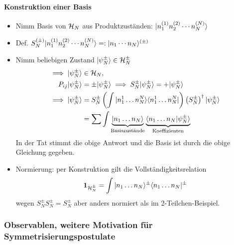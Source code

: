 \documentclass[11pt,a4paper]{report}
\begin{document}
\paragraph{Konstruktion einer Basis}
\begin{itemize}
\item Nimm Basis von $\mathcal{H}_N$ aus Produktzuständen: $|n_1^{(1)}n_2^{(2)}\cdots n_N^{(N)}\rangle$
\item Def. $S_N^{(\pm )}|n_1^{(1)}n_2^{(2)}\cdots n_N^{(N)}\rangle =: |n_1\cdots n_N\rangle^{(\pm )}$
\item Nimm beliebigen Zustand $|\psi_N^{\pm}\rangle \in \mathcal{H}_N^{\pm}$
\begin{align*}
    \implies |\psi_N^{\pm}\rangle &\in \mathcal{H}_N, \\
    P_{i j} |\psi_N^{\pm}\rangle &= \pm |\psi_N^{\pm}\rangle \implies S_N^{\pm} |\psi_N^{\pm}\rangle = + |\psi_N^{\pm}\rangle \\
    \implies |\psi_N^{\pm}\rangle &=  S_N^{\pm} \left(\int |n_1^1 \ldots n_N^N\rangle\langle n_1^1 \ldots n_N^N |\right) \left(S_N^{\pm}\right)^\dagger |\psi_N^{\pm}\rangle\\
    &= \sum\int \underbrace{|n_1 \ldots n_N\rangle}_{\text{Basiszustände}} \underbrace{\langle n_1 \ldots n_N | \psi_N^{\pm} \rangle}_{\text{Koeffizienten}}
\end{align*}
In der Tat stimmt die obige Antwort und die Basis ist durch die obige Gleichung gegeben.
\item Normierung: per Konstruktion gilt die Vollständigkeitsrelation
$$\mathbf{1}_{\mathcal{H}^{\pm}_N} = \int |n_1 \ldots n_N\rangle^{\pm}\langle n_1\ldots n_N |^{\pm}$$
wegen $S_N^{\pm} S_N^{\pm} = S_N^{\pm}$ aber anders normiert als im 2-Teilchen-Beispiel.
\end{itemize}

\subsubsection{Observablen, weitere Motivation für Symmetrisierungspostulate}
\end{document}
